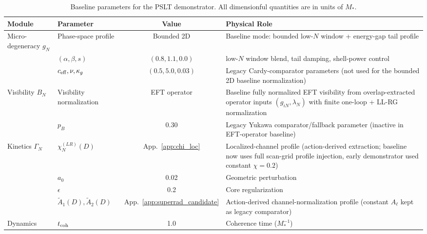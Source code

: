 \documentclass[aps,prd,onecolumn,notitlepage,nofootinbib,superscriptaddress,11pt,floatfix]{revtex4-2}
\begin{document}
\begin{table}[htbp]
\centering
\caption{Baseline parameters for the PSLT demonstrator. All dimensionful quantities are in units of $M_*$.}
\label{tab:params}
\small
\setlength{\tabcolsep}{4pt}
\begin{tabular}{@{}l l c l@{}}
\toprule
\textbf{Module} & \textbf{Parameter} & \textbf{Value} & \textbf{Physical Role} \\
\midrule
\parbox[t]{0.16\linewidth}{Micro-degeneracy $g_N$} & \parbox[t]{0.18\linewidth}{Phase-space profile} & \parbox[t]{0.15\linewidth}{Bounded 2D} & \parbox[t]{0.37\linewidth}{Baseline mode: bounded low-$N$ window + energy-gap tail profile} \\
& \parbox[t]{0.18\linewidth}{$(\alpha,\beta,s)$} & \parbox[t]{0.15\linewidth}{$(0.8,1.1,0.0)$} & \parbox[t]{0.37\linewidth}{low-$N$ window blend, tail damping, shell-power control} \\
& \parbox[t]{0.18\linewidth}{$c_{\rm eff},\nu,\kappa_g$} & \parbox[t]{0.15\linewidth}{$(0.5,5.0,0.03)$} & \parbox[t]{0.37\linewidth}{Legacy Cardy-comparator parameters (not used for the bounded 2D baseline normalization)} \\
\midrule
\parbox[t]{0.16\linewidth}{Visibility $B_N$} & \parbox[t]{0.18\linewidth}{Visibility normalization} & \parbox[t]{0.15\linewidth}{EFT operator} & \parbox[t]{0.37\linewidth}{Baseline fully normalized EFT visibility from overlap-extracted operator inputs $(g_{iN},\lambda_N)$ with finite one-loop + LL-RG normalization} \\
& \parbox[t]{0.18\linewidth}{$p_B$} & \parbox[t]{0.15\linewidth}{0.30} & \parbox[t]{0.37\linewidth}{Legacy Yukawa comparator/fallback parameter (inactive in EFT-operator baseline)} \\
\midrule
\parbox[t]{0.16\linewidth}{Kinetics $\Gamma_N$} & \parbox[t]{0.18\linewidth}{$\chi_N^{(LR)}(D)$} & \parbox[t]{0.12\linewidth}{App.~\ref{app:chi_loc}} & \parbox[t]{0.40\linewidth}{Localized-channel profile (action-derived extraction; baseline now uses full scan-grid profile injection, early demonstrator used constant $\chi=0.2$)} \\
& \parbox[t]{0.18\linewidth}{$a_0$} & \parbox[t]{0.12\linewidth}{0.02} & \parbox[t]{0.40\linewidth}{Geometric perturbation} \\
& \parbox[t]{0.18\linewidth}{$\epsilon$} & \parbox[t]{0.12\linewidth}{0.2} & \parbox[t]{0.40\linewidth}{Core regularization} \\
& \parbox[t]{0.18\linewidth}{$\tilde A_1(D), \tilde A_2(D)$} & \parbox[t]{0.12\linewidth}{App.~\ref{app:superrad_candidate}} & \parbox[t]{0.40\linewidth}{Action-derived channel-normalization profile (constant $A_\ell$ kept as legacy comparator)} \\
\midrule
\parbox[t]{0.16\linewidth}{Dynamics} & \parbox[t]{0.18\linewidth}{$t_{\rm coh}$} & \parbox[t]{0.12\linewidth}{1.0} & \parbox[t]{0.40\linewidth}{Coherence time ($M_*^{-1}$)} \\
\bottomrule
\end{tabular}
\end{table}
\end{document}
